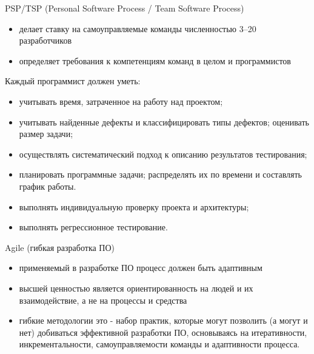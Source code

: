 \documentclass{beamer}
\begin{document}
\begin{frame}[t]
PSP/TSP (Personal Software Process / Team Software Process)
\begin{itemize}
\item делает ставку на самоуправляемые команды численностью 3–20 разработчиков
\item определяет требования к компетенциям команд в целом и программистов
\end{itemize}
Каждый программист должен уметь:
\begin{itemize}
\item учитывать время, затраченное на работу над проектом;
\item учитывать найденные дефекты и классифицировать типы дефектов;
оценивать размер задачи;
\item осуществлять систематический подход к описанию результатов
тестирования;
\item планировать программные задачи; распределять их по времени и составлять график работы.
\item выполнять индивидуальную проверку проекта и архитектуры;
\item выполнять регрессионное тестирование.
\end{itemize}
\end{frame}

\begin{frame}[t]
Agile (гибкая разработка ПО)
\begin{itemize}
\item применяемый в разработке ПО процесс должен быть адаптивным
\item высшей ценностью является ориентированность на людей и их взаимодействие, а не на процессы и средства
\item гибкие методологии это - набор практик, которые могут позволить (а могут и нет) добиваться эффективной разработки ПО, основываясь на итеративности, инкрементальности, самоуправляемости команды и адаптивности процесса.
\end{itemize}
\end{frame}
\end{document}

